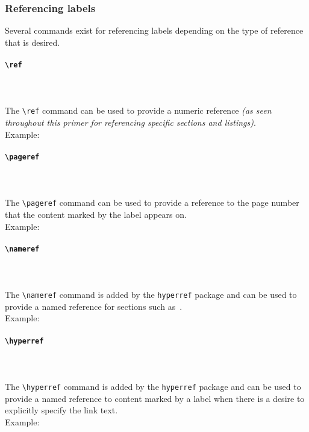 \subsubsection*{Referencing labels}
Several commands exist for referencing labels depending on the type of reference that is desired.
\paragraph{\texttt{\textbackslash ref}}\mbox{}\\\\
The \texttt{\textbackslash ref} command can be used to provide a numeric reference \textit{(as seen throughout this primer for referencing specific sections and listings)}.\\
Example: 

\paragraph{\texttt{\textbackslash pageref}}\mbox{}\\\\
The \texttt{\textbackslash pageref} command can be used to provide a reference to the page number that the content marked by the label appears on.\\
Example: 

\paragraph{\texttt{\textbackslash nameref}}\mbox{}\\\\
The \texttt{\textbackslash nameref} command is added by the \texttt{hyperref} package and can be used to provide a named reference for sections such as~.\\
Example: 

\paragraph{\texttt{\textbackslash hyperref}}\mbox{}\\\\
The \texttt{\textbackslash hyperref} command is added by the \texttt{hyperref} package and can be used to provide a named reference to content marked by a label when there is a desire to explicitly specify the link text.\\
Example: 
